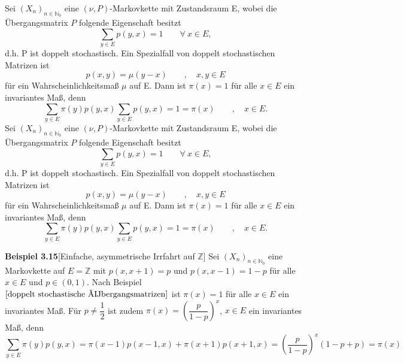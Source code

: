 \label{doppelt stochastische Übergangsmatrizen}
Sei $(X_{n})_{n \in \mathbb{N}_{0}}$ eine $(\nu,P)$-Markovkette mit Zustandsraum E, wobei die Übergangsmatrix $P$ folgende Eigenschaft besitzt
\begin{equation*}
\sum_{y \in E} p(y,x) = 1 \qquad \forall \: x \in E,
\end{equation*}
d.h. P ist doppelt stochastisch. Ein Spezialfall von doppelt stochastischen Matrizen ist
\begin{equation*}
 p(x,y) = \mu(y-x) \qquad, \quad x,y \in E
\end{equation*} 
für ein Wahrscheinlichkeitsmaß $\mu$ auf E. Dann ist $\pi(x) = 1$ für alle $x \in E$ ein invariantes Maß, denn 
\begin{equation*}
\sum_{y \in E} \pi(y) p(y,x) \sum_{y \in E} p(y,x) = 1 = \pi(x) \qquad , \quad x \in E.
\end{equation*}\label{doppelt stochastische Übergangsmatrizen}
Sei $(X_{n})_{n \in \mathbb{N}_{0}}$ eine $(\nu,P)$-Markovkette mit Zustandsraum E, wobei die Übergangsmatrix $P$ folgende Eigenschaft besitzt
\begin{equation*}
\sum_{y \in E} p(y,x) = 1 \qquad \forall \: x \in E,
\end{equation*}
d.h. P ist doppelt stochastisch. Ein Spezialfall von doppelt stochastischen Matrizen ist
\begin{equation*}
 p(x,y) = \mu(y-x) \qquad, \quad x,y \in E
\end{equation*} 
für ein Wahrscheinlichkeitsmaß $\mu$ auf E. Dann ist $\pi(x) = 1$ für alle $x \in E$ ein invariantes Maß, denn 
\begin{equation*}
\sum_{y \in E} \pi(y) p(y,x) \sum_{y \in E} p(y,x) = 1 = \pi(x) \qquad , \quad x \in E.
\end{equation*}

\textbf{Beispiel 3.15}[Einfache, asymmetrische Irrfahrt auf $\mathbb{Z}$]
\label{Einfache, asymmetrische Irrfahrt auf Z}
Sei $(X_{n})_{n \in \mathbb{N}_{0}}$ eine Markovkette auf $E=\mathbb{Z}$ mit $p(x,x+1) = p$ und $p(x,x-1)=1-p$ für alle $x \in E$ und $p \in (0,1)$. Nach Beispiel $\ref{doppelt stochastische Übergangsmatrizen}$ ist $\pi(x) = 1$ für alle $x \in E$ ein invariantes Maß. Für  $p \neq \dfrac{1}{2}$ ist zudem $\pi(x) = {\left( \dfrac{p}{1-p} \right)}^{x}$, $x \in E$ ein invariantes Maß, denn
\begin{equation*}
\sum_{y \in E} \pi(y) p(y,x) = \pi(x-1)p(x-1,x) + \pi(x+1)p(x+1,x)= {\left( \dfrac{p}{1-p} \right)}^{x}(1-p+p) = \pi(x)
\end{equation*}